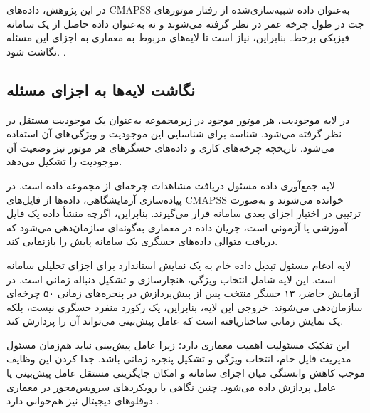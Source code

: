 \documentclass[a4paper,fleqn]{report}
\begin{document}
در این پژوهش، داده‌های \gls{CMAPSS} به‌عنوان داده شبیه‌سازی‌شده
از رفتار موتورهای جت در طول چرخه عمر در نظر گرفته می‌شوند و نه
به‌عنوان داده حاصل از یک سامانه فیزیکی برخط. بنابراین، نیاز است تا لایه‌های مربوط به معماری به اجزای این مسئله نگاشت شود. \cite{qi2021enabling,tao2018digital}.

\subsection{نگاشت لایه‌ها به اجزای مسئله}
\label{sec:layer-mapping}

در لایه موجودیت، هر موتور موجود در زیرمجموعه  به‌عنوان
یک موجودیت مستقل در نظر گرفته می‌شود. شناسه 
برای شناسایی این موجودیت و ویژگی‌های آن استفاده
می‌شود. تاریخچه چرخه‌های کاری و داده‌های حسگرهای هر موتور نیز وضعیت آن موجودیت را تشکیل می‌دهد.

لایه جمع‌آوری داده مسئول دریافت مشاهدات چرخه‌ای از مجموعه داده
است. در پیاده‌سازی آزمایشگاهی، داده‌ها از فایل‌های
\gls{CMAPSS} خوانده می‌شوند و به‌صورت ترتیبی در اختیار اجزای
بعدی سامانه قرار می‌گیرند. بنابراین، اگرچه منشأ داده یک فایل
آموزشی یا آزمونی است، جریان داده در معماری به‌گونه‌ای سازمان‌دهی
می‌شود که دریافت متوالی داده‌های حسگری یک سامانه پایش را بازنمایی
کند.

لایه ادغام مسئول تبدیل داده خام به یک نمایش استاندارد برای اجزای
تحلیلی سامانه است. این لایه شامل انتخاب ویژگی، هنجارسازی و تشکیل
دنباله زمانی است. در آزمایش حاضر، ۱۳ حسگر منتخب پس از
پیش‌پردازش در پنجره‌های زمانی ۵۰ چرخه‌ای سازمان‌دهی می‌شوند.
خروجی این لایه، بنابراین، یک رکورد منفرد حسگری نیست، بلکه یک
نمایش زمانی ساختاریافته است که عامل پیش‌بینی می‌تواند آن را
پردازش کند.

این تفکیک مسئولیت اهمیت معماری دارد؛ زیرا عامل پیش‌بینی نباید
هم‌زمان مسئول مدیریت فایل خام، انتخاب ویژگی و تشکیل پنجره زمانی
باشد. جدا کردن این وظایف موجب کاهش وابستگی میان اجزای سامانه و
امکان جایگزینی مستقل عامل پیش‌بینی یا عامل پردازش داده می‌شود. چنین
نگاهی با رویکردهای سرویس‌محور در معماری دوقلوهای دیجیتال نیز
هم‌خوانی دارد \cite{qi2021enabling,tao2018digital}.
\end{document}
